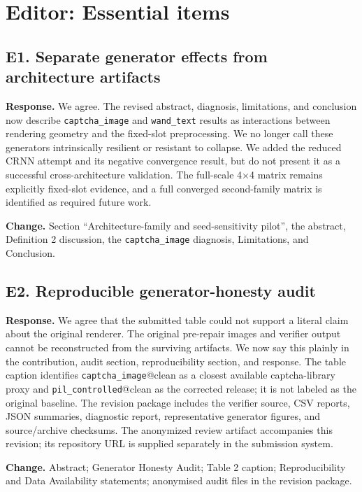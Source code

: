 \documentclass[11pt]{article}
\newcommand{\response}[1]{\par\noindent\textbf{Response.} #1\par}
\newcommand{\change}[1]{\par\noindent\textbf{Change.} #1\par}
\begin{document}
\section*{Editor: Essential items}
\subsection*{E1. Separate generator effects from architecture artifacts}
\response{We agree. The revised abstract, diagnosis, limitations, and conclusion now describe \texttt{captcha\_image} and \texttt{wand\_text} results as interactions between rendering geometry and the fixed-slot preprocessing. We no longer call these generators intrinsically resilient or resistant to collapse. We added the reduced CRNN attempt and its negative convergence result, but do not present it as a successful cross-architecture validation. The full-scale 4$\times$4 matrix remains explicitly fixed-slot evidence, and a full converged second-family matrix is identified as required future work.}
\change{Section ``Architecture-family and seed-sensitivity pilot'', the abstract, Definition 2 discussion, the \texttt{captcha\_image} diagnosis, Limitations, and Conclusion.}

\subsection*{E2. Reproducible generator-honesty audit}
\response{We agree that the submitted table could not support a literal claim about the original renderer. The original pre-repair images and verifier output cannot be reconstructed from the surviving artifacts. We now say this plainly in the contribution, audit section, reproducibility section, and response. The table caption identifies \texttt{captcha\_image}@clean as a closest available captcha-library proxy and \texttt{pil\_controlled}@clean as the corrected release; it is not labeled as the original baseline. The revision package includes the verifier source, CSV reports, JSON summaries, diagnostic report, representative generator figures, and source/archive checksums. The anonymized review artifact accompanies this revision; its repository URL is supplied separately in the submission system.}
\change{Abstract; Generator Honesty Audit; Table 2 caption; Reproducibility and Data Availability statements; anonymised audit files in the revision package.}
\end{document}
